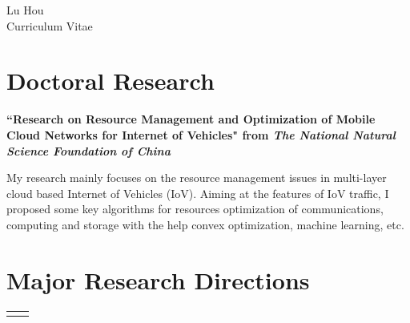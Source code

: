 \documentclass[10pt]{article} %
\begin{document}
\begin{paracol}{2} %


\parbox[top][0.12\textheight][c]{\linewidth}{ %
	\vspace{-0.04\textheight} %
	\centering %
	{\Huge Lu Hou}\hspace{1pt} \\\medskip %
	{\Huge\color{headings}\cvtextfont Curriculum Vitae}
}


\section{Doctoral Research}

{\raggedright\textbf{``Research on Resource Management and Optimization of Mobile Cloud Networks for Internet of Vehicles" from \textit{The National Natural Science Foundation of China}}\\\medskip}

My research mainly focuses on the resource management issues in multi-layer cloud based Internet of Vehicles (IoV). Aiming at the features of IoV traffic, I proposed some key algorithms for resources optimization of communications, computing and storage with the help convex optimization, machine learning, etc.

\medskip %

\section{Major Research Directions}
	\begin{supertabular}{rl}
	\end{supertabular}


\end{paracol}
\end{document}
